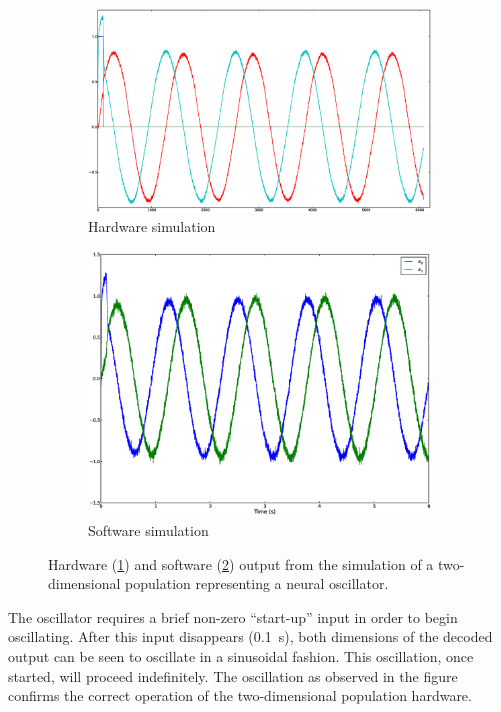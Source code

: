 \documentclass[english]{article}
\begin{document}
\begin{figure}[h!]
\centering

\begin{subfigure}[a]{0.4\textwidth}
\centering
\includegraphics[width=4in]{oscillator-2d.eps}
\caption{Hardware simulation}
\label{fig:oscillator2d:hw}
\end{subfigure}

\begin{subfigure}[b]{0.4\textwidth}
\centering
\includegraphics[width=4in]{oscillator-2d-sw.eps}
\caption{Software simulation}
\label{fig:oscillator2d:sw}
\end{subfigure}

\caption[Simulation of a 2D neural oscillator in hardware and software.]
{Hardware (\ref{fig:oscillator2d:hw}) and software (\ref{fig:oscillator2d:sw}) output from the simulation of a two-dimensional population representing a neural oscillator.}
\label{fig:oscillator2d}
\end{figure}

The oscillator requires a brief non-zero ``start-up'' input in order to begin oscillating.
After this input disappears (0.1~s), both dimensions of the decoded output can be seen to
oscillate in a sinusoidal fashion. This oscillation, once started, will proceed indefinitely.
The oscillation as observed in the figure confirms the correct operation of the two-dimensional
population hardware.
\end{document}

